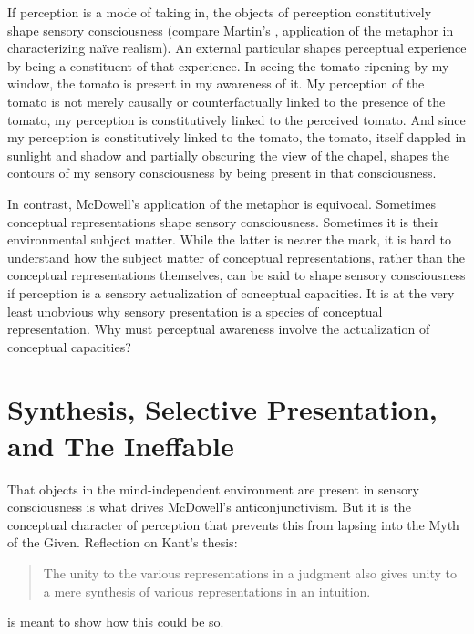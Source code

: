 \documentclass[12pt]{article}
\begin{document}
If perception is a mode of taking in, the objects of perception constitutively shape sensory consciousness (compare Martin's \citeyear[64]{Martin:2004fj}, application of the metaphor in characterizing naïve realism). An external particular shapes perceptual experience by being a constituent of that experience. In seeing the tomato ripening by my window, the tomato is present in my awareness of it. My perception of the tomato is not merely causally or counterfactually linked to the presence of the tomato, my perception is constitutively linked to the perceived tomato. And since my perception is constitutively linked to the tomato, the tomato, itself dappled in sunlight and shadow and partially obscuring the view of the chapel, shapes the contours of my sensory consciousness by being present in that consciousness.

In contrast, McDowell's application of the metaphor is equivocal. Sometimes conceptual representations shape sensory consciousness. Sometimes it is their environmental subject matter. While the latter is nearer the mark, it is hard to understand how the subject matter of conceptual representations, rather than the conceptual representations themselves, can be said to shape sensory consciousness if perception is a sensory actualization of conceptual capacities. It is at the very least unobvious why sensory presentation is a species of conceptual representation. Why must perceptual awareness involve the actualization of conceptual capacities?


\section{Synthesis, Selective Presentation, and The Ineffable} %
\label{sec:selective_presentation_and_synthesis}

That objects in the mind-independent environment are present in sensory consciousness is what drives McDowell's anticonjunctivism. But it is the conceptual character of perception that prevents this from lapsing into the Myth of the Given. Reflection on Kant's thesis:
\begin{quote}
    The unity to the various representations in a judgment also gives unity to a mere synthesis of various representations in an intuition. \citep[A79/B104--5]{Kant:1781fk}
\end{quote}
is meant to show how this could be so.
\end{document}
